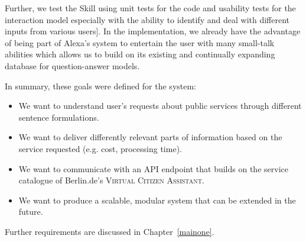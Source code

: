 Further, we test the Skill using unit tests for the code and usability tests for the interaction model especially with the ability to identify and deal with different inputs from various users].
In the implementation, we already have the advantage of being part of Alexa's system to entertain the user with
many small-talk abilities 
which allows us to build on its existing and continually expanding database for question-answer models.


In summary, these goals were defined for the system:

\begin{itemize}
	\item We want to understand user's requests about public services through different sentence formulations.
	
	\item We want to deliver differently relevant parts of information based on the service requested (e.g. cost, processing time).
	
	\item We want to communicate with an API endpoint that builds on the service catalogue of Berlin.de's \textsc{Virtual Citizen Assistant}.
	
	\item We want to produce a scalable, modular system that can be extended in the future.
\end{itemize}

Further requirements are discussed in Chapter~\ref{mainone}.






















